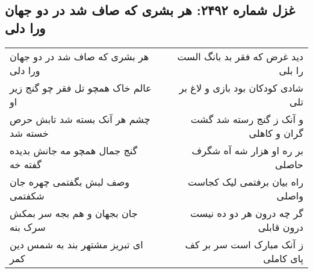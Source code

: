 \begin{center}
\section*{غزل شماره ۲۴۹۲: هر بشری که صاف شد در دو جهان ورا دلی}
\label{sec:2492}
\begin{longtable}{l p{0.5cm} r}
هر بشری که صاف شد در دو جهان ورا دلی
&&
دید غرض که فقر بد بانگ الست را بلی
\\
عالم خاک همچو تل فقر چو گنج زیر او
&&
شادی کودکان بود بازی و لاغ بر تلی
\\
چشم هر آنک بسته شد تابش حرص خسته شد
&&
و آنک ز گنج رسته شد گشت گران و کاهلی
\\
گنج جمال همچو مه جانش بدیده گفته خه
&&
بر ره او هزار شه آه شگرف حاصلی
\\
وصف لبش بگفتمی چهره جان شکفتمی
&&
راه بیان برفتمی لیک کجاست واصلی
\\
جان بجهان و هم بجه سر بمکش سرک بنه
&&
گر چه درون هر دو ده نیست درون قابلی
\\
ای تبریز مشتهر بند به شمس دین کمر
&&
ز آنک مبارک است سر بر کف پای کاملی
\\
\end{longtable}
\end{center}
